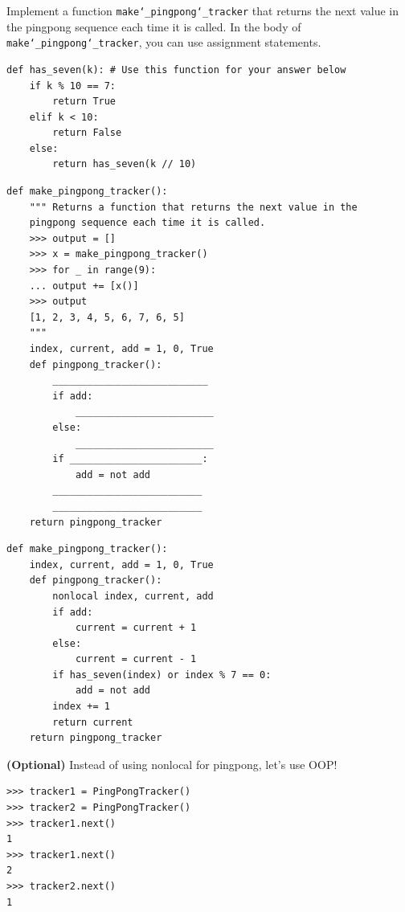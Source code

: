 \documentclass{exam}
\begin{document}
\begin{questions}
\begin{blocksection}
Implement a function \texttt{make\char`_pingpong\char`_tracker} that returns the
next value in the pingpong sequence each time it is called. In the body of
\texttt{make\char`_pingpong\char`_tracker}, you can use assignment statements.
\newline

\begin{lstlisting}
def has_seven(k): # Use this function for your answer below
    if k % 10 == 7:
        return True
    elif k < 10:
        return False
    else:
        return has_seven(k // 10)
\end{lstlisting}

\begin{nonsol}
\begin{lstlisting}
def make_pingpong_tracker():
    """ Returns a function that returns the next value in the
    pingpong sequence each time it is called.
    >>> output = []
    >>> x = make_pingpong_tracker()
    >>> for _ in range(9):
    ... output += [x()]
    >>> output
    [1, 2, 3, 4, 5, 6, 7, 6, 5]
    """
    index, current, add = 1, 0, True
    def pingpong_tracker():
        ___________________________
        if add:
            ________________________
        else:
            ________________________
        if _______________________:
            add = not add
        __________________________
        __________________________
    return pingpong_tracker

\end{lstlisting}
\end{nonsol}

\begin{solution}
\begin{lstlisting}
def make_pingpong_tracker():
    index, current, add = 1, 0, True
    def pingpong_tracker():
        nonlocal index, current, add
        if add:
            current = current + 1
        else:
            current = current - 1
        if has_seven(index) or index % 7 == 0:
            add = not add
        index += 1
        return current
    return pingpong_tracker
\end{lstlisting}
\end{solution}

\end{blocksection}

\begin{blocksection}
\question \textbf{(Optional)} Instead of using nonlocal for pingpong, let's use OOP!

\begin{nonsol}
\begin{lstlisting}
>>> tracker1 = PingPongTracker()
>>> tracker2 = PingPongTracker()
>>> tracker1.next()
1
>>> tracker1.next()
2
>>> tracker2.next()
1


\end{lstlisting}
\end{nonsol}
\end{blocksection}
\end{questions}
\end{document}
